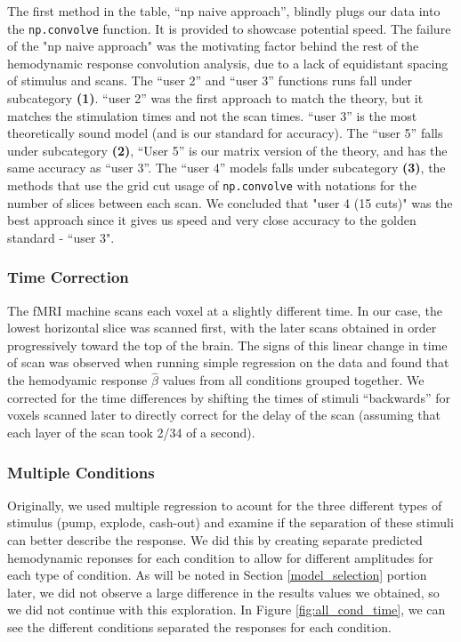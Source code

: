 \par \noindent The first method in the table, ``np naive approach'', blindly 
plugs our data into the \texttt{np.convolve} function. It is provided to 
showcase potential speed. The failure of the "np naive approach" was the 
motivating factor behind the rest of the hemodynamic response convolution 
analysis, due to a lack of equidistant spacing of stimulus and scans. The 
``user 2'' and ``user 3'' functions runs fall under subcategory 
\textbf{(1)}. ``user 2'' was the first approach to
match the theory, but it matches the stimulation times and not the scan times.
``user 3'' is the most theoretically sound model (and is our standard for 
accuracy). The ``user 5'' falls under subcategory \textbf{(2)}, ``User 5''  is
our matrix version of the theory, and has the same accuracy as ``user 3''. The 
``user 4'' models falls under subcategory \textbf{(3)}, the methods that use the
grid cut usage of \texttt{np.convolve} with notations for the number of slices 
between each scan. We concluded that "user 4 (15 cuts)" was the best approach 
since it gives us speed and very close accuracy to the golden standard - ``user 
3".

\subsubsection{Time Correction}

\par \indent The fMRI machine scans each voxel at a slightly different time. 
In our case, the lowest horizontal slice was scanned first, with the later 
scans obtained in order progressively toward the top of the brain. The signs 
of this linear change in time of scan was observed when running simple 
regression on the data and found that the hemodyamic response $\hat{\beta}$ 
values from all conditions grouped together. We corrected for the time 
differences by shifting the times of stimuli ``backwards'' for voxels scanned 
later to directly correct for the delay of the scan (assuming that each layer 
of the scan took 2/34 of a second).

\subsubsection{Multiple Conditions}

\par \indent Originally, we used multiple regression to acount for the 
three different types of stimulus (pump, explode, cash-out) and examine if the 
separation of these stimuli can better describe the response. We did this by 
creating separate predicted hemodynamic reponses for each condition to allow 
for different amplitudes for each type of condition. As will be noted in 
Section \ref{model_selection} portion later, we did not observe a large 
difference in the results values we obtained, so we did not continue with 
this exploration. In Figure \ref{fig:all_cond_time}, we can see the different 
conditions separated the responses for each condition.
 

